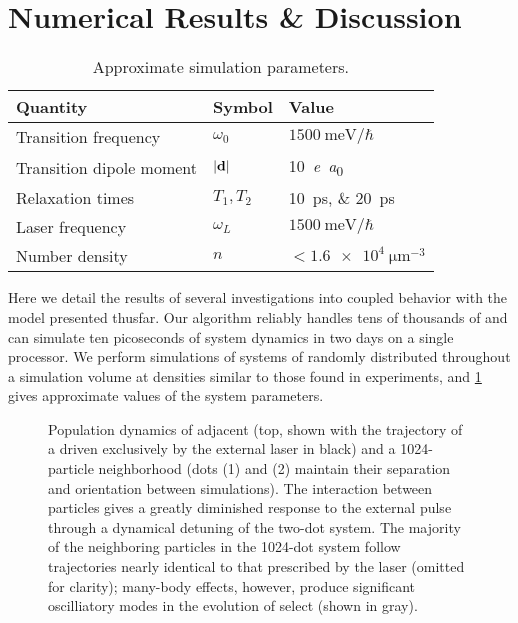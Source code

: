 \section{Numerical Results \& Discussion}
\begin{table}
  \begin{ruledtabular}
    \begin{tabular}{lll}
      Quantity                 & Symbol         & Value                        \\ \hline
      Transition frequency     & $\omega_0$     & $\SI{1500}{\milli\eV}/\hbar$ \\
      Transition dipole moment & $\abs{\vb{d}}$ & \SI{10}{\elementarycharge\bohr} \\
      Relaxation times         & $T_{1}, T_{2}$ & \SIlist{10;20}{\pico\second} \\
      Laser frequency          & $\omega_L$     & $\SI{1500}{\milli\eV}/\hbar$ \\
      Number density           & $n$            & $< \SI{1.6e4}{\micro\meter\tothe{-3}}$ \\
    \end{tabular}
  \end{ruledtabular}
  \caption{\label{table:parameters}Approximate simulation parameters.}
\end{table}

Here we detail the results of several investigations into coupled \qd{} behavior with the model presented thusfar.
Our algorithm reliably handles tens of thousands of \qds{} and can simulate ten picoseconds of system dynamics in two days on a single processor.
We perform simulations of systems of \qds{} randomly distributed throughout a simulation volume at densities similar to those found in experiments, and \cref{table:parameters} gives approximate values of the system parameters.

\begin{figure}
  
  \caption{\label{fig:density stats}Population dynamics of adjacent \qds{} (top, shown with the trajectory of a \qd{} driven exclusively by the external laser in black) and a 1024-particle neighborhood (dots (1) and (2) maintain their separation and orientation between simulations).
    The interaction between particles gives a greatly diminished response to the external pulse through a dynamical detuning of the two-dot system.
    The majority of the neighboring particles in the 1024-dot system follow trajectories nearly identical to that prescribed by the laser (omitted for clarity); many-body effects, however, produce significant oscilliatory modes in the evolution of select \qds{} (shown in gray).
}
\end{figure}

